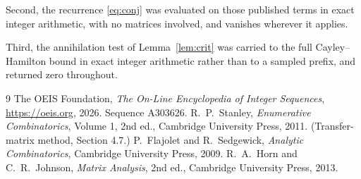 \documentclass[11pt,a4paper]{article}
\theoremstyle{plain}
\theoremstyle{definition}
\begin{document}
Second, the recurrence \eqref{eq:conj} was evaluated on those published terms in exact
integer arithmetic, with no matrices involved, and vanishes wherever it applies.

Third, the annihilation test of Lemma~\ref{lem:crit} was carried to the full
Cayley--Hamilton bound in exact integer arithmetic rather than to a sampled prefix, and
returned zero throughout.

\begin{thebibliography}{9}
 The OEIS Foundation, \emph{The On-Line Encyclopedia of Integer
Sequences}, \url{https://oeis.org}, 2026. Sequence A303626.
 R.~P.~Stanley, \emph{Enumerative Combinatorics}, Volume 1, 2nd ed.,
Cambridge University Press, 2011. (Transfer-matrix method, Section 4.7.)
 P.~Flajolet and R.~Sedgewick, \emph{Analytic Combinatorics}, Cambridge
University Press, 2009.
 R.~A.~Horn and C.~R.~Johnson, \emph{Matrix Analysis}, 2nd ed., Cambridge
University Press, 2013.
\end{thebibliography}
\end{document}
